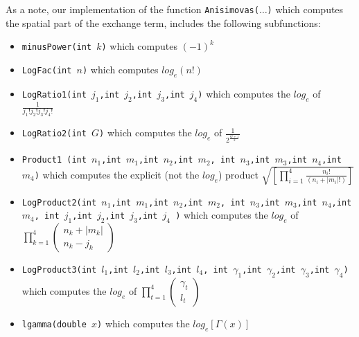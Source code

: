 As a note, our implementation of the function \texttt{Anisimovas($\dots$)} which computes the spatial part of the exchange term, includes the following subfunctions:
\begin{itemize}
 \item \texttt{minusPower(int $k$)} which computes $(-1)^k$

\item \texttt{LogFac(int $n$)} which computes $log_e(n!)$

\item  \texttt{LogRatio1(int $j_1$,int $j_2$,int $j_3$,int $j_4$)} which computes the  $log_e$ of $\frac{1}{j_1!j_2!j_3!j_4!}$

\item \texttt{LogRatio2(int $G$)} which computes the $log_e$ of $\frac{1}{2^{\frac{G+1}{2}}}$

\item \texttt{Product1 (int $n_1$,int $m_1$,int $n_2$,int $m_2$, int $n_3$,int $m_3$,int $n_4$,int $m_4$)} which computes the explicit (not the $log_e$) product $\sqrt{ \left[ \prod_{i=1}^4 \frac{n_i !}{(n_i+|m_i|!)} \right] }$ 

\item \texttt{LogProduct2(int $n_1$,int $m_1$,int $n_2$,int $m_2$, int $n_3$,int $m_3$,int $n_4$,int $m_4$, int $j_1$,int $j_2$,int $j_3$,int $j_4$ )} which computes the  $log_e$ of $\prod_{k=1}^4 \begin{pmatrix} n_k+|m_k|\\n_k-j_k\end{pmatrix}$

\item \texttt{LogProduct3(int $l_1$,int $l_2$,int $l_3$,int $l_4$, int $\gamma_1$,int $\gamma_2$,int $\gamma_3$,int $\gamma_4$)} which computes the  $log_e$ of $\prod_{t=1}^4 \begin{pmatrix} \gamma_t\\l_t\end{pmatrix}$

\item \texttt{lgamma(double $x$)} which computes the  $log_e\left[ \Gamma(x) \right]$
\end{itemize}

